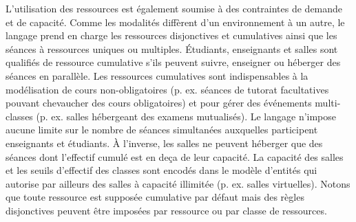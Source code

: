 
L'utilisation des ressources est également soumise à des contraintes de demande et de capacité.
%
%
Comme les modalités diffèrent d'un environnement à un autre, le langage prend en charge les ressources disjonctives et cumulatives ainsi que les séances à ressources uniques ou multiples. 
%
Étudiants, enseignants et salles sont qualifiés de ressource cumulative s'ils peuvent suivre, enseigner ou héberger des séances en parallèle.
%
Les ressources cumulatives sont indispensables à la modélisation de cours non-obligatoires (p. ex. séances de tutorat facultatives pouvant chevaucher des cours obligatoires) et pour gérer des événements multi-classes (p. ex. salles hébergeant des examens mutualisés).
%
Le langage n'impose aucune limite sur le nombre de séances simultanées auxquelles participent enseignants et étudiants.
À l'inverse, les salles ne peuvent héberger que des séances dont l'effectif cumulé est en deça de leur capacité.
%
La capacité des salles et les seuils d'effectif des classes sont encodés dans le modèle d'entités qui autorise par ailleurs des salles à capacité illimitée (p. ex. salles virtuelles).
%
Notons que toute ressource est supposée cumulative par défaut
mais des règles disjonctives peuvent être imposées par ressource ou par classe de ressources.
%

